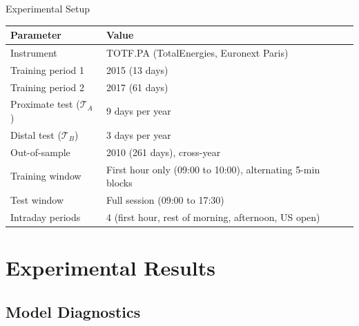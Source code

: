 \documentclass{beamer}
\begin{document}
\begin{frame}{Experimental Setup}
    \begin{table}[h]
    \centering
    \footnotesize
    \begin{tabular}{ll}
    \toprule
    \textbf{Parameter} & \textbf{Value} \\
    \midrule
    Instrument         & TOTF.PA (TotalEnergies, Euronext Paris) \\
    Training period 1  & 2015 (13 days) \\
    Training period 2  & 2017 (61 days) \\
    Proximate test ($\mathcal{T}_A$) & 9 days per year \\
    Distal test ($\mathcal{T}_B$)    & 3 days per year \\
    Out-of-sample      & 2010 (261 days), cross-year \\
    Training window    & First hour only (09:00 to 10:00), alternating 5-min blocks \\
    Test window        & Full session (09:00 to 17:30) \\
    Intraday periods   & 4 (first hour, rest of morning, afternoon, US open) \\
    \bottomrule
    \end{tabular}
    \end{table}
\end{frame}


\section{Experimental Results}
\subsection{Model Diagnostics}
\end{document}
